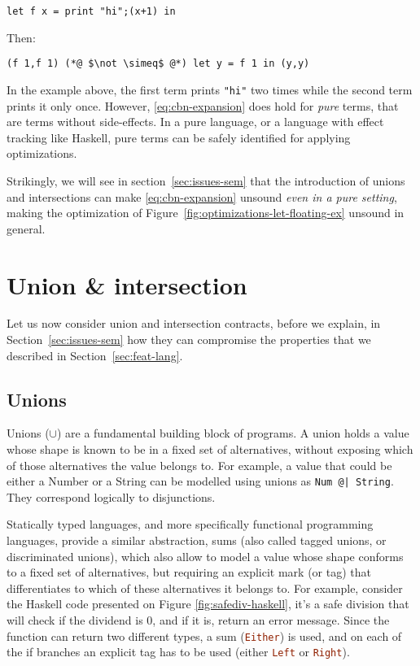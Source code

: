 \documentclass[sigplan,10pt,review,anonymous]{acmart}
\newcommand{\nickel}[1]{\lstinline[language=nickel]{#1}}
\newcommand{\haskell}[1]{\lstinline[language=Haskell]{#1}}
\begin{document}
\begin{lstlisting}[language=Nickel]
let f x = print "hi";(x+1) in
\end{lstlisting}

Then:

\begin{lstlisting}[language=Nickel]
(f 1,f 1) (*@ $\not \simeq$ @*) let y = f 1 in (y,y)
\end{lstlisting}

In the example above, the first term prints \nickel{"hi"} two times while the
second term prints it only once. However, \ref{eq:cbn-expansion} does hold for
\emph{pure} terms, that are terms without side-effects. In a pure language, or a
language with effect tracking like Haskell, pure terms can be safely identified for applying
optimizations.

Strikingly, we will see in section~\ref{sec:issues-sem} that the introduction of
unions and intersections can make \ref{eq:cbn-expansion} unsound
\emph{even in a pure setting}, making the optimization of
Figure~\ref{fig:optimizations-let-floating-ex} unsound in general.


\section{Union \& intersection}
\label{sec:union-inter}

Let us now consider union and intersection contracts, before we
explain, in Section~\ref{sec:issues-sem} how they can compromise the
properties that we described in Section~\ref{sec:feat-lang}.

\subsection{Unions}
Unions ($\cup$) are a fundamental building block of programs.
A union holds a value whose
shape is known to be in a fixed set of alternatives, without exposing
which of those alternatives the value belongs to.
For example, a value that could be either a Number or a String can be
modelled using unions as \nickel{Num @| String}.
They correspond logically to disjunctions.

Statically typed languages, and more specifically functional programming
languages, provide a similar abstraction, sums
(also called tagged unions, or discriminated unions), which
also allow to model a value whose shape conforms to a fixed set of
alternatives, but requiring an explicit mark (or tag) that differentiates
to which of these alternatives it belongs to.
For example, consider the Haskell code presented on Figure
\ref{fig:safediv-haskell}, it's a safe division that will
check if the dividend is 0, and if it is, return an
error message.
Since the function can return two different types, a sum
(\haskell{Either}) is used, and on each
of the if branches an explicit tag has to be used (either
\haskell{Left} or \haskell{Right}).
\end{document}
